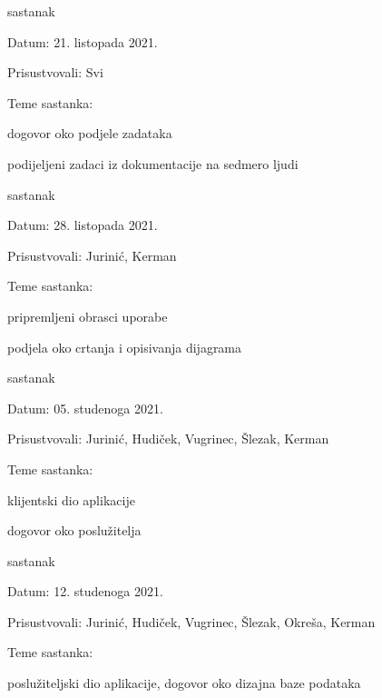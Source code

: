 \begin{packed_enum}
			\item  sastanak
			\item[] \begin{packed_item}
				\item Datum: 21. listopada 2021.
				\item Prisustvovali: Svi
				\item Teme sastanka:
				\begin{packed_item}
					\item  dogovor oko podjele zadataka
					\item  podijeljeni zadaci iz dokumentacije na sedmero ljudi
				\end{packed_item}
			\end{packed_item}
			\item  sastanak
			\item[] \begin{packed_item}
				\item Datum: 28. listopada 2021.
				\item Prisustvovali: Jurinić, Kerman
				\item Teme sastanka:
				\begin{packed_item}
					\item  pripremljeni obrasci uporabe
					\item  podjela oko crtanja i opisivanja dijagrama
				\end{packed_item}
			\end{packed_item}
			\item  sastanak
			\item[] \begin{packed_item}
				\item Datum: 05. studenoga 2021.
				\item Prisustvovali: Jurinić, Hudiček, Vugrinec, Šlezak, Kerman
				\item Teme sastanka:
				\begin{packed_item}
					\item  klijentski dio aplikacije
					\item  dogovor oko poslužitelja
				\end{packed_item}
			\end{packed_item}
\eject
			\item  sastanak
			\item[] \begin{packed_item}
				\item Datum: 12. studenoga 2021.
				\item Prisustvovali: Jurinić, Hudiček, Vugrinec, Šlezak, Okreša, Kerman
				\item Teme sastanka:
				\begin{packed_item}
					\item  poslužiteljski dio aplikacije, dogovor oko dizajna baze podataka
				\end{packed_item}
			\end{packed_item}
			
			
		\end{packed_enum}
		
